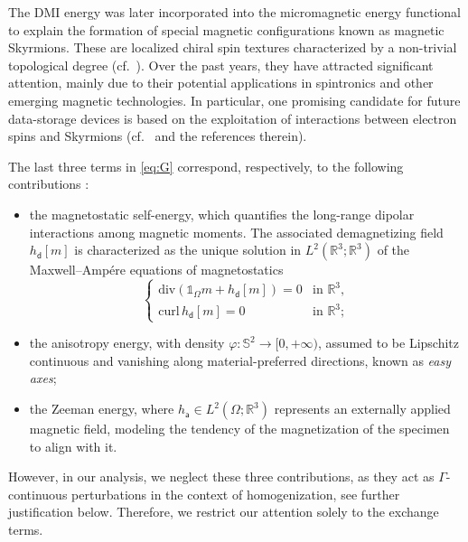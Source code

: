 \documentclass[reqno,11pt]{amsart}
\numberwithin{equation}{section}
\theoremstyle{thmlemcorr}
\numberwithin{theorem}{section}
\theoremstyle{thmlemcorr*}
\theoremstyle{defi}
\theoremstyle{remexample}
\theoremstyle{ass}
\renewcommand{\S}{\mathbb{S}}
\newcommand{\1}{\mathds{1}}
\begin{document}
The DMI energy was later incorporated into the micromagnetic energy functional to explain the formation of special magnetic configurations known as magnetic Skyrmions. These are localized chiral spin textures characterized by a non-trivial topological degree (cf.\ \cite{Me14, BoPa20}). Over the past years, they have attracted significant attention, mainly due to their potential applications in spintronics and other emerging magnetic technologies. In particular, one promising candidate for future data-storage devices is based on the exploitation of interactions between electron spins and Skyrmions (cf.\ \cite{FRC17} and the references therein). 

The last three terms in \eqref{eq:G} correspond, respectively, to the following contributions \cite{Br63, HuSch08}:
\begin{itemize}
    \item the magnetostatic self-energy, which quantifies the long-range dipolar interactions
among magnetic moments. The associated demagnetizing
field $h_\mathsf{d} [m]$ is characterized as the unique solution in $L^2 
(\mathbb{R}^3 ; \mathbb{R}^3)$ of the Maxwell--Ampére equations of
magnetostatics
\begin{equation*}
  \label{eq:Maxwell} \left\{\begin{array}{ll}
    \mathrm{div} (\mathds{1}_\Omega m +h_{\mathsf{d}} [m]) = 0 & \textrm{in }
    \mathbb{R}^3,\\
    \mathrm{curl}\, h_{\mathsf{d}} [m] = 0 & \textrm{in } \mathbb{R}^3 ;
  \end{array}\right.
  \end{equation*}
      \item the anisotropy energy, with density $\varphi: \S^2 \to [0, +\infty)$, assumed to be Lipschitz continuous and vanishing along material-preferred directions, known as \textit{easy axes};
      \item the Zeeman energy, where \(h_{\mathsf{a}} \in L^2(\Omega; \mathbb{R}^3)\) represents an externally applied magnetic field, modeling the tendency of the magnetization of the specimen to align with it.
  \end{itemize}
However, in our analysis, we neglect these three contributions, as they act as 
$\Gamma$-continuous perturbations in the context of homogenization, see further justification below. Therefore, we restrict our attention solely to the exchange terms.
\end{document}

